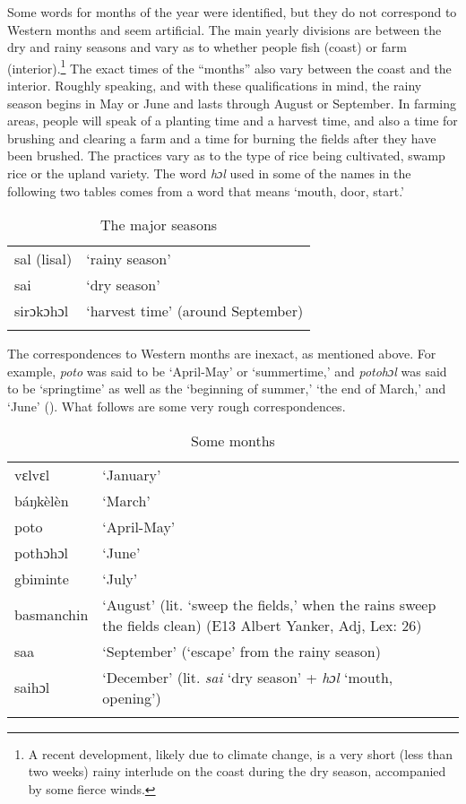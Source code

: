 Some words for months of the year were identified, but they do not correspond to Western months and seem artificial. The main yearly divisions are between the dry and rainy seasons and vary as to whether people fish (coast) or farm (interior).\footnote{A recent development, likely due to climate change, is a very short (less than two weeks) rainy interlude on the coast during the dry season, accompanied by some fierce winds.} The exact times of the “months” also vary between the coast and the interior. Roughly speaking, and with these qualifications in mind, the rainy season begins in May or June and lasts through August or September. In farming areas, people will speak of a planting time and a harvest time, and also a time for brushing and clearing a farm and a time for burning the fields after they have been brushed. The practices vary as to the type of rice being cultivated, swamp rice or the upland variety. The word \textit{hɔl} used in some of the names in the following two tables comes from a word that means ‘mouth, door, start.'

\begin{table}
\caption{\label{tab:wordcat:23}The major seasons}



\begin{tabular}{ll}
\lsptoprule
sal (lisal) & ‘rainy season'\\
sai & ‘dry season'\\
sirɔkɔhɔl & ‘harvest time' (around September)\\
\lspbottomrule
\end{tabular}
\end{table}

The correspondences to Western months are inexact, as mentioned above. For example, \textit{poto} was said to be ‘April-May' or ‘summertime,' and \textit{potohɔl} was said to be ‘springtime' as well as the ‘beginning of summer,' ‘the end of March,' and ‘June' (\citealt{Pichl1967}). What follows are some very rough correspondences.

\begin{table}
\caption{\label{tab:wordcat:24}Some months}



\begin{tabularx}{\textwidth}{lQ}
\lsptoprule
vɛlvɛl & ‘January'\\
báŋkèlèn & ‘March'\\
poto & ‘April-May'\\
pothɔhɔl & ‘June'\\
gbiminte & ‘July'\\
basmanchin & ‘August' (lit. ‘sweep the fields,' when the rains sweep the fields clean) (E13 Albert Yanker, Adj, Lex: 26)\\
saa & ‘September' (‘escape' from the rainy season)\\
saihɔl & ‘December' (lit. \textit{sai} ‘dry season' + \textit{hɔl} ‘mouth, opening')\\
\lspbottomrule
\end{tabularx}
\end{table}

